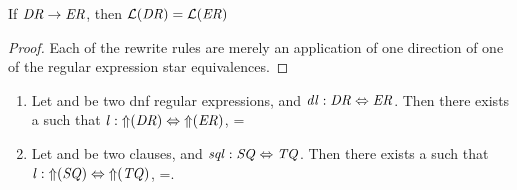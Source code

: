 \begin{lemma}
\label{lem:rrl}
If $\mathit{DR}\rightarrow\mathit{ER}$, then $\mathcal{L}(\mathit{DR})=\mathcal{L}(\mathit{ER})$
\end{lemma}
\begin{proof}
Each of the rewrite rules are merely an application of one direction of one of
the regular expression star equivalences.
\end{proof}

\begin{lemma}\leavevmode
\label{lem:dnfcal}
\begin{enumerate}
\item Let \DNFRegex{} and \DNFRegexAlt{} be two dnf regular expressions, and $\mathit{dl} : \mathit{DR} \Leftrightarrow \mathit{ER}$.  Then there exists a \Lens{} such that $\mathit{l} : \mathit{\Uparrow}(\mathit{DR}) \Leftrightarrow \mathit{\Uparrow}(\mathit{ER})$, \SemanticsOf{\Lens}=\SemanticsOf{\DNFLens}

\item Let \Sequence{} and \SequenceAlt{} be two clauses, and $\mathit{sql} : \mathit{SQ} \Leftrightarrow \mathit{TQ}$.  Then there exists a \Lens{} such that $\mathit{l} : \mathit{\Uparrow}(\mathit{SQ}) \Leftrightarrow \mathit{\Uparrow}(\mathit{TQ})$, \SemanticsOf{\Lens}=\SemanticsOf{\SequenceLens}.


\end{enumerate}
\end{lemma}
